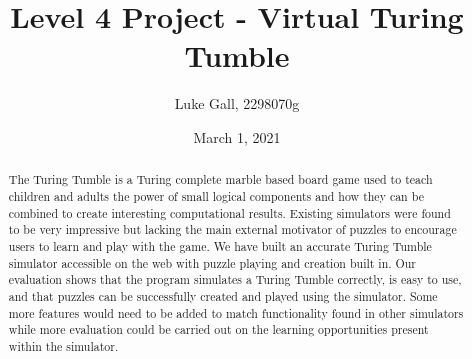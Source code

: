 \documentclass{l4proj}
\begin{document}
\title{Level 4 Project - Virtual Turing Tumble}
\author{Luke Gall, 2298070g}
\date{March 1, 2021}

\maketitle

\begin{abstract}
    The Turing Tumble is a Turing complete marble based board game used to teach children and adults the power of small logical components and how they can be combined to create interesting computational results. Existing simulators were found to be very impressive but lacking the main external motivator of puzzles to encourage users to learn and play with the game. We have built an accurate Turing Tumble simulator accessible on the web with puzzle playing and creation built in. Our evaluation shows that the program simulates a Turing Tumble correctly, is easy to use, and that puzzles can be successfully created and played using the simulator. Some more features would need to be added to match functionality found in other simulators while more evaluation could be carried out on the learning opportunities present within the simulator.
\end{abstract}


%
%
\def\consentname {Luke Gall} %
\def\consentdate {12 February 2021} %
%
\educationalconsent


\tableofcontents
\end{document}

